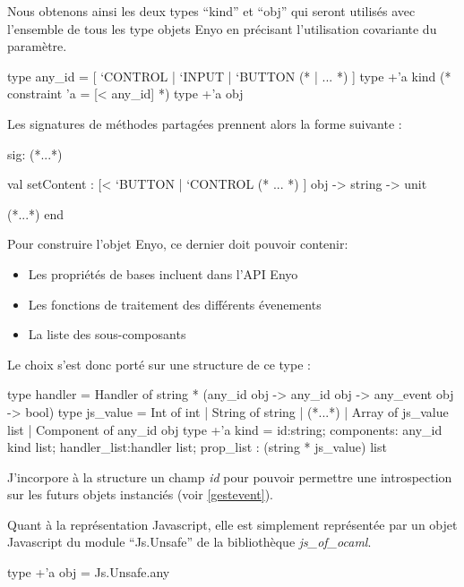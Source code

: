 \documentclass[11pt,a4paper]{report}
\begin{document}
Nous obtenons ainsi les deux types ``kind'' et ``obj'' qui seront utilisés avec l'ensemble de tous 
les type objets Enyo en précisant l'utilisation covariante du paramètre.
\begin{OCaml}
  type any_id = 
        [ `CONTROL | `INPUT | `BUTTON (* | ... *) ]
  type +'a kind (* constraint 'a = [< any_id] *)
  type +'a obj
\end{OCaml}
Les signatures de méthodes partagées prennent alors la forme suivante :
\begin{OCaml}
  sig:
  (*...*)
  
     val setContent : 
         [< `BUTTON | `CONTROL (* ... *) ] obj 
         -> string 
         -> unit
  
  (*...*)
  end
\end{OCaml}

Pour construire l'objet Enyo, ce dernier doit pouvoir contenir:
\begin{itemize}
\item Les propriétés de bases incluent dans l'API Enyo
\item Les fonctions de traitement des différents évenements
\item La liste des sous-composants
\end{itemize}

Le choix s'est donc porté sur une structure de ce type :

\begin{OCaml}
  type handler = Handler of string * (any_id obj -> any_id obj -> any_event obj -> bool)
  type js_value = Int of int | String of string 
                | (*...*) 
                | Array of js_value list 
                | Component of any_id obj 
  type +'a kind = {id:string; 
                   components: any_id kind list; 
                   handler_list:handler list; 
                   prop_list : (string * js_value) list 
                  }
\end{OCaml}

J'incorpore à la structure un champ \emph{id} pour pouvoir permettre une introspection 
sur les futurs objets instanciés (voir \ref{gestevent}).

Quant à la représentation Javascript, elle est simplement représentée par un objet Javascript
du module ``Js.Unsafe'' de la bibliothèque \emph{js\_of\_ocaml}.

\begin{OCaml}
  type +'a obj = Js.Unsafe.any
\end{OCaml}
\end{document}
